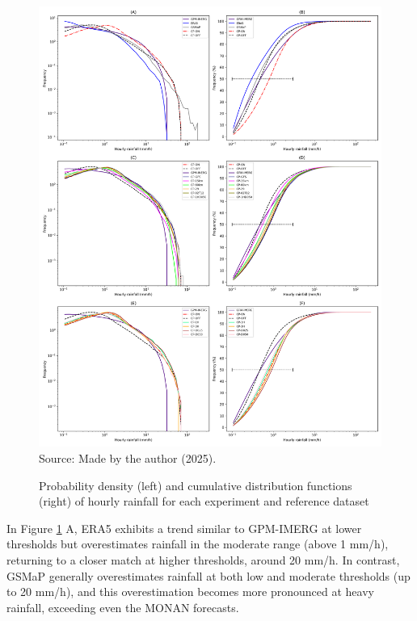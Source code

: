 \begin{figure}[!ht]
	\centering
	\caption{Probability density (left) and cumulative distribution functions (right) of hourly rainfall for each experiment and reference dataset} %
	\includegraphics[width=\textwidth]{docs/figuras/chapter5/painel_pdf_cdf_FINAL.png} 
	\vspace{0.5em}
	Source: Made by the author (2025).  %
	\label{fig:probdensity} %
\end{figure}

In Figure \ref{fig:probdensity} A, ERA5 exhibits a trend similar to GPM-IMERG at lower thresholds but overestimates rainfall in the moderate range (above 1 mm/h), returning to a closer match at higher thresholds, around 20 mm/h. In contrast, GSMaP generally overestimates rainfall at both low and moderate thresholds (up to 20 mm/h), and this overestimation becomes more pronounced at heavy rainfall, exceeding even the MONAN forecasts.

